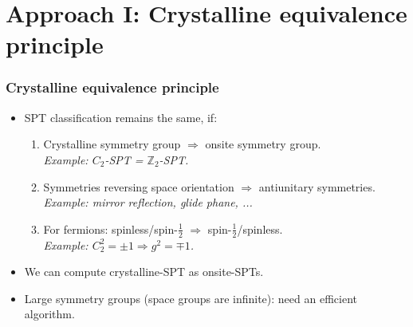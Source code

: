 \documentclass[xcolor=table, aspectratio=169,ignorenonframetext]{beamer}
\begin{document}
\section{Approach I: Crystalline equivalence principle}

\begin{frame}
  \frametitle{Crystalline equivalence principle}
  \begin{itemize}
  \item SPT classification remains the same, if:
    \begin{enumerate}
    \item Crystalline symmetry group $\Rightarrow$ onsite symmetry group.\\
      \emph{Example: $C_2$-SPT = $\mathbb Z_2$-SPT.}
    \item Symmetries reversing space orientation $\Rightarrow$ antiunitary symmetries.\\
      \emph{Example: mirror reflection, glide phane, ...}
    \item For fermions: spinless/spin-$\frac12$ $\Rightarrow$ spin-$\frac12$/spinless.\\
      \emph{Example: $C_2^2=\pm1 \Rightarrow g^2=\mp1$.}
    \end{enumerate}
  \item We can compute crystalline-SPT as onsite-SPTs.
  \item Large symmetry groups (space groups are infinite): need an efficient algorithm.
  \end{itemize}
  \begin{center}
  \end{center}
\end{frame}
\end{document}
